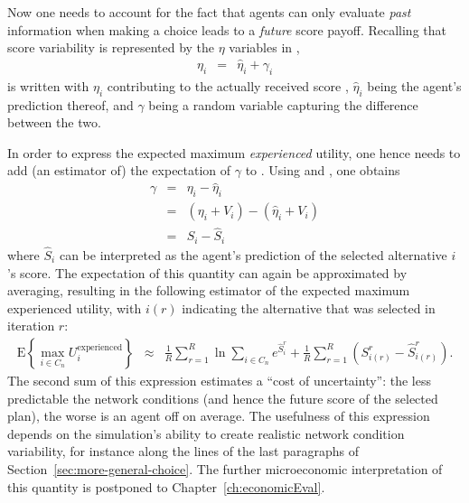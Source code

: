 Now one needs to account for the fact that agents can only evaluate 
\emph{past} information when making a choice leads to a \emph{future} 
score payoff.
Recalling that score variability is represented by the $\eta$ variables 
in ,
\begin{eqnarray}
\eta_{i} & = & \hat{\eta}_{i} +\gamma_{i}\label{eq:score-random-walk}
\end{eqnarray}
is written with $\eta_{i}$ contributing to the actually received score
, $\hat{\eta}_{i}$ being the agent's prediction
thereof, and $\gamma$ being a random variable capturing the
difference between the two. 

In order to express the expected maximum \emph{experienced}
utility, one hence needs to add (an estimator of) the expectation of $\gamma$
to .
Using  and ,
one obtains
\begin{eqnarray}
\gamma & = & \eta_{i} - \hat{\eta}_{i}\\
& = & (\eta_{i} + V_i) - (\hat{\eta}_{i} + V_i)\\
 & = & S_i - \hat{S}_i
\end{eqnarray}
where $\hat{S}_i$ can be interpreted as the agent's prediction of
the selected alternative $i$'s score.
The expectation of this quantity can again be approximated by averaging,
resulting in the following estimator of the expected maximum experienced
utility, with $i(r)$ indicating the alternative that was selected in
iteration $r$:
\begin{eqnarray}
\text{E}\left\{\max_{i\in C_n} U_i^\text{experienced} \right\}
& \approx &
\frac{1}{R}\sum_{r=1}^{R}\ln\sum_{i\in C_n}e^{\hat{S}_i^{r}}
+
\frac{1}{R}\sum_{r=1}^{R}\left(S_{i(r)}^{r}-\hat{S}_{i(r)}^{r}\right).
\label{eq:wartezimmer-corrected}
\end{eqnarray}
%
The second sum of this expression estimates a ``cost of uncertainty'': the
less predictable the network conditions (and hence the future score of the
selected plan), the worse is an agent off on average. The usefulness of this
expression depends on the simulation's ability to create realistic
network condition variability, for instance along the lines of the last
paragraphs of Section~\ref{sec:more-general-choice}.
The further microeconomic interpretation of this quantity is postponed to
Chapter~\ref{ch:economicEval}.

